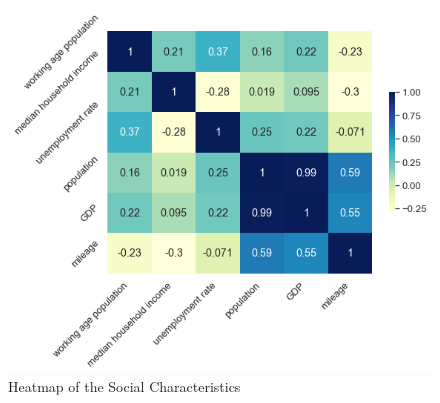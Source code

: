 
\clearpage
\begin{figure}[H]
    \centering
    \includegraphics[scale=0.7]{Chapter-3/Figures/heatmap.png}
    \caption[Heatmap of the Social Characteristics]{Heatmap of the Social Characteristics
        \texttt{} }
    \label{heatmap}
\end{figure}
\clearpage


